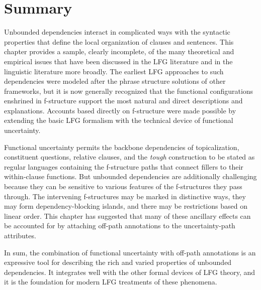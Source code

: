 \documentclass[output=paper,hidelinks]{langscibook}
\begin{document}
\section{Summary}

Unbounded dependencies interact in complicated ways with the syntactic properties that define the local organization of clauses and sentences.  This chapter provides a sample, clearly incomplete, of the many theoretical and empirical issues that have been discussed in the LFG literature and in the linguistic literature more broadly.  The earliest LFG approaches to such dependencies were modeled after the phrase structure solutions of other frameworks, but it is now generally recognized that the functional configurations enshrined in f-structure support the most natural and direct descriptions and explanations.  Accounts based directly on f-structure were made possible by extending the basic LFG formalism with the technical device of functional uncertainty.

Functional uncertainty permits the backbone dependencies of topicalization, constituent questions, relative clauses, and the \textit{tough} construction to be stated as regular languages containing the f-structure paths that connect fillers to their within-clause functions.  But unbounded dependencies are additionally challenging because they can be sensitive to various features of the f-structures they pass through.  The intervening f-structures may be marked in distinctive ways, they may form dependency-blocking islands, and there may be restrictions based on linear order.  This chapter has suggested that many of these ancillary effects can be accounted for by attaching off-path annotations to the uncertainty-path attributes.

In sum, the combination of functional uncertainty with off-path annotations is an expressive tool for describing the rich and varied properties of unbounded dependencies.  It integrates well with the other formal devices of LFG theory, and it is the foundation for modern LFG treatments of these phenomena.


%
%
\end{document}
